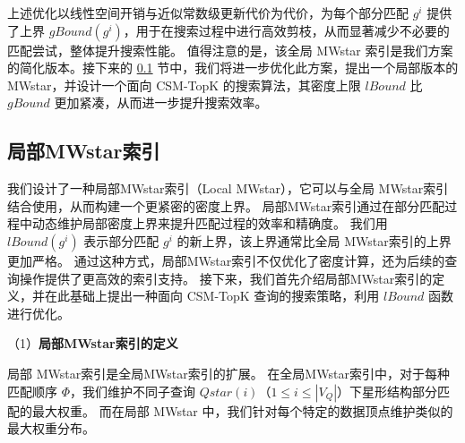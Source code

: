 \begin{algorithm}[H]
    \end{algorithm}

     上述优化以线性空间开销与近似常数级更新代价为代价，为每个部分匹配 $g^i$ 提供了上界 $gBound(g^i)$，用于在搜索过程中进行高效剪枝，从而显著减少不必要的匹配尝试，整体提升搜索性能。
     值得注意的是，该全局 MWstar 索引是我们方案的简化版本。接下来的 \ref{mwstar:local} 节中，我们将进一步优化此方案，提出一个局部版本的 MWstar，并设计一个面向 CSM-TopK 的搜索算法，其密度上限 $lBound$ 比 $gBound$ 更加紧凑，从而进一步提升搜索效率。

\subsection{局部MWstar索引}
\label{mwstar:local}
我们设计了一种局部MWstar索引（Local MWstar），它可以与全局 MWstar索引结合使用，从而构建一个更紧密的密度上界。
局部MWstar索引通过在部分匹配过程中动态维护局部密度上界来提升匹配过程的效率和精确度。
我们用 $lBound(g^i)$ 表示部分匹配 $g^i$ 的新上界，该上界通常比全局 MWstar索引的上界更加严格。
通过这种方式，局部MWstar索引不仅优化了密度计算，还为后续的查询操作提供了更高效的索引支持。
接下来，我们首先介绍局部MWstar索引的定义，并在此基础上提出一种面向 CSM-TopK 查询的搜索策略，利用 $lBound$ 函数进行优化。


（1）\textbf{局部MWstar索引的定义}

局部 MWstar索引是全局MWstar索引的扩展。
在全局MWstar索引中，对于每种匹配顺序 $\Phi$，我们维护不同子查询 $Qstar(i)$（$1\leq i\leq |V_Q|$）下星形结构部分匹配的最大权重。
而在局部 MWstar 中，我们针对每个特定的数据顶点维护类似的最大权重分布。

